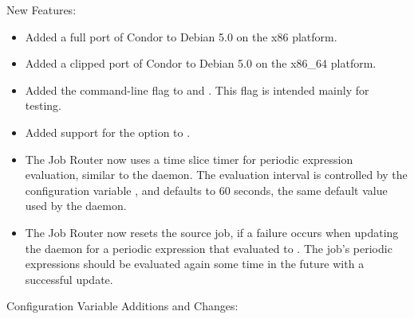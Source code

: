 \noindent New Features:

\begin{itemize}

\item Added a full port of Condor to Debian 5.0 on the x86 platform.

\item Added a clipped port of Condor to Debian 5.0 on the x86\_64 platform.

\item Added the  command-line flag to 
and .  This flag is intended mainly for testing.

\item Added support for the  option to .

\item The Job Router now uses a time slice timer for periodic expression
  evaluation, similar to the  daemon.
  The evaluation interval is controlled by 
  the configuration variable ,
  and defaults to 60 seconds, the same default value used by
  the  daemon.

\item The Job Router now resets the source job, if a failure occurs when
  updating the  daemon for a periodic expression that
  evaluated to .  The job's periodic expressions should be
  evaluated again some time in the future with a successful update.

\end{itemize}

\noindent Configuration Variable Additions and Changes:

